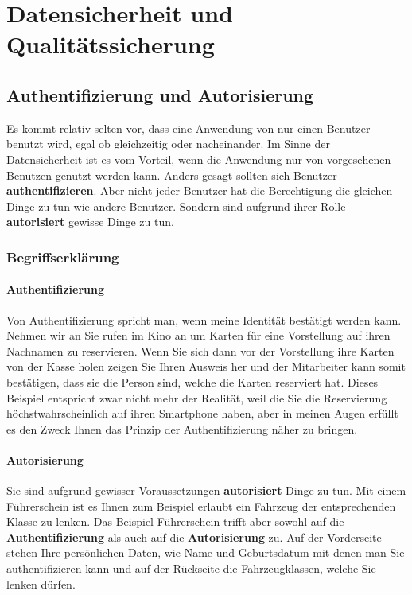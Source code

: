 \chapter{Datensicherheit und Qualitätssicherung}
\label{cha:Datensicherheit}


\section{Authentifizierung und Autorisierung}


Es kommt relativ selten vor, dass eine Anwendung von nur einen Benutzer benutzt wird, egal ob gleichzeitig oder nacheinander. Im Sinne der Datensicherheit ist es vom Vorteil, wenn die Anwendung nur von vorgesehenen Benutzen genutzt werden kann. Anders gesagt sollten sich Benutzer \textbf{authentifizieren}. Aber nicht jeder Benutzer hat die Berechtigung die gleichen Dinge zu tun wie andere Benutzer. Sondern sind aufgrund ihrer Rolle \textbf{autorisiert} gewisse Dinge zu tun.

\subsection{Begriffserklärung}

\subsubsection{Authentifizierung}

Von Authentifizierung spricht man, wenn meine Identität bestätigt werden kann. Nehmen wir an Sie rufen im Kino an um Karten für eine Vorstellung auf ihren Nachnamen zu reservieren. Wenn Sie sich dann vor der Vorstellung ihre Karten von der Kasse holen zeigen Sie Ihren Ausweis her und der Mitarbeiter kann somit bestätigen, dass sie die Person sind, welche die Karten reserviert hat. Dieses Beispiel entspricht zwar nicht mehr der Realität, weil die Sie die Reservierung höchstwahrscheinlich auf ihren Smartphone haben, aber in meinen Augen erfüllt es den Zweck Ihnen das Prinzip der Authentifizierung näher zu bringen.

\subsubsection{Autorisierung}

Sie sind aufgrund gewisser Voraussetzungen \textbf{autorisiert} Dinge zu tun. Mit einem Führerschein ist es Ihnen zum Beispiel erlaubt ein Fahrzeug der entsprechenden Klasse zu lenken. Das Beispiel Führerschein trifft aber sowohl auf die \textbf{Authentifizierung} als auch auf die \textbf{Autorisierung} zu. Auf der Vorderseite stehen Ihre persönlichen Daten, wie Name und Geburtsdatum mit denen man Sie authentifizieren kann und auf der Rückseite die Fahrzeugklassen, welche Sie lenken dürfen.

